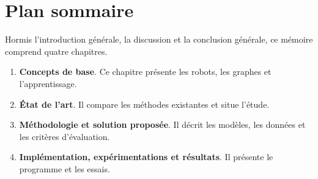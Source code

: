 \section{Plan sommaire}
Hormis l'introduction générale, la discussion et la conclusion générale, ce mémoire comprend quatre chapitres.
\begin{enumerate}\setlength{\itemsep}{0pt}
\item \textbf{Concepts de base}. Ce chapitre présente les robots, les graphes et l'apprentissage.
\item \textbf{État de l'art}. Il compare les méthodes existantes et situe l'étude.
\item \textbf{Méthodologie et solution proposée}. Il décrit les modèles, les données et les critères d'évaluation.
\item \textbf{Implémentation, expérimentations et résultats}. Il présente le programme et les essais.
\end{enumerate}
